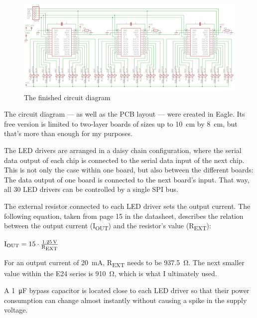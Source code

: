 \documentclass[a4paper, 11pt, titlepage]{article}
\newenvironment{ownmath}
{\vspace{2mm}\hspace{15pt}\begin{math}}
{\end{math}\vspace{2mm}}
\begin{document}
\begin{figure}[h]
\vspace{0mm}
\includegraphics[width=\textwidth]{./images/schematic.png}
\vspace{-10mm}
\caption{The finished circuit diagram}
\vspace{4mm}
\end{figure}

The circuit diagram --- as well as the PCB layout --- were created in Eagle. Its free version is
limited to two-layer boards of sizes up to \SI{10}{\centi\meter} by \SI{8}{\centi\meter}, but
that's more than enough for my purposes.

The LED drivers are arranged in a daisy chain configuration, where the serial data output of each
chip is connected to the serial data input of the next chip. This is not only the case within one
board, but also between the different boards: The data output of one board is connected to the
next board's input. That way, all 30 LED drivers can be controlled by a single SPI bus.

\def \iout {I\textsubscript{OUT}\xspace}
\def \rext {R\textsubscript{EXT}\xspace}

The external resistor connected to each LED driver sets the output current. The following
equation, taken from page 15 in the datasheet, describes the relation between the output current
(\iout) and the resistor's value (\rext):

\begin{ownmath}
\textrm{\iout} = 15 \cdot \frac{\SI{1.25}{\volt}}{\si{\rext}}
\end{ownmath}

For an output current of \SI{20}{\milli\ampere}, \rext needs to be \SI{937.5}{\ohm}. The next
smaller value within the E24 series is \SI{910}{\ohm}, which is what I ultimately used.

A \SI{1}{\micro\farad} bypass capacitor is located close to each LED driver so that their power
consumption can change almost instantly without causing a spike in the supply voltage.
\end{document}
